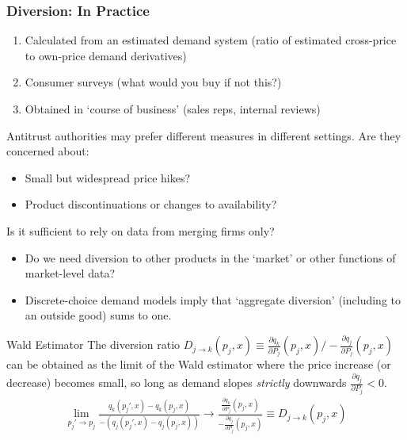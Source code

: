 \documentclass[aspectratio=169,10pt]{beamer}
\begin{document}
\begin{frame}
\frametitle{Diversion: In Practice}
\begin{enumerate}
\item Calculated from an estimated demand system (ratio of estimated cross-price to own-price demand derivatives)
\item Consumer surveys (what would you buy if not this?)
\item Obtained in `course of business' (sales reps, internal reviews)
\end{enumerate}
Antitrust authorities may prefer different measures in different settings. Are they concerned about:
\begin{itemize}
\item Small but widespread price hikes?
\item Product discontinuations or changes to availability?
\end{itemize}
Is it sufficient to rely on data from merging firms only?
\begin{itemize}
\item Do we need diversion to other products in the `market' or other functions of market-level data?
\item Discrete-choice demand models imply that `aggregate diversion' (including to an outside good) sums to one.
\end{itemize}
\end{frame}


\begin{frame}{Wald Estimator}
The diversion ratio $D_{j \rightarrow k}(p_j,x) \equiv\frac{\partial q_k}{\partial P_j}(p_j,x)/-\frac{\partial q_j}{\partial P_j}(p_j,x)$ can be obtained as the limit of the Wald estimator where the price increase (or decrease) becomes small, so long as demand slopes \textit{strictly} downwards $\frac{\partial q_j}{\partial P_j} <0$.
\begin{align*}                               
\lim_{p_j' \rightarrow p_j} \frac{q_k(p_j',x) - q_k(p_j,x)}{-(q_j(p_j',x) - q_j(p_j,x))} \rightarrow \frac{\frac{\partial q_k}{\partial P_j}(p_j,x)}{-\frac{\partial q_j}{\partial P_j}(p_j,x)} \equiv D_{j \rightarrow k}(p_j,x)
\end{align*}
\end{frame}
\end{document}
